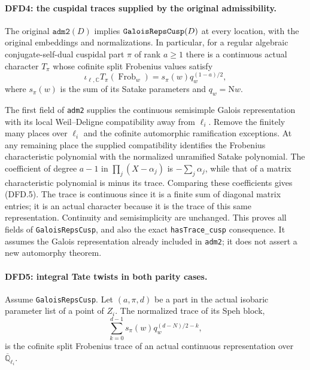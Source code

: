 \documentclass[11pt,a4paper]{article}
\numberwithin{equation}{section}
\theoremstyle{remark}\newtheorem{remark}[theorem]{Remark}
\begin{document}
\paragraph{DFD4: the cuspidal traces supplied by the original admissibility.}
\label{claim:DFD4}
The original $\texttt{adm2}(D)$ implies
$\texttt{Galois\allowbreak Reps\allowbreak Cusp}(D)$ at every location, with the
original embeddings and normalizations. In particular, for a
regular algebraic conjugate-self-dual cuspidal part $\pi$ of
rank $a\ge1$ there is a continuous actual character $T_\pi$
whose cofinite split Frobenius values satisfy
\[
 \iota_{\ell,\mathbb C}T_\pi(\operatorname{Frob}_w)
       =s_\pi(w)q_w^{(1-a)/2},                            \tag{DFD.5}
\]
where $s_\pi(w)$ is the sum of its Satake parameters and
$q_w=\mathrm Nw$.

The first field of \texttt{adm2} supplies the continuous
semisimple Galois representation with its local
Weil--Deligne compatibility away from $\ell_i$. Remove the
finitely many places over $\ell_i$ and the cofinite automorphic
ramification exceptions. At any remaining place the supplied
compatibility identifies the Frobenius characteristic
polynomial with the normalized unramified Satake polynomial.
The coefficient of degree $a-1$ in
$\prod_j(X-\alpha_j)$ is $-\sum_j\alpha_j$, while that of a
matrix characteristic polynomial is minus its trace. Comparing
these coefficients gives (DFD.5). The trace is continuous since
it is a finite sum of diagonal matrix entries; it is an actual
character because it is the trace of this same representation.
Continuity and semisimplicity are unchanged. This proves all
fields of \texttt{Galois\allowbreak Reps\allowbreak Cusp}, and also the exact
\texttt{has\allowbreak Trace\_\allowbreak cusp} consequence. It assumes the Galois
representation already included in \texttt{adm2}; it does not
assert a new automorphy theorem.

\paragraph{DFD5: integral Tate twists in both parity cases.}
\label{claim:DFD5}
Assume \texttt{Galois\allowbreak Reps\allowbreak Cusp}. Let $(a,\pi,d)$ be a part in
the actual isobaric parameter list of a point of $Z_i$. The
normalized trace of its Speh block,
\[
       \sum_{k=0}^{d-1}s_\pi(w)q_w^{(d-N)/2-k},           \tag{DFD.6}
\]
is the cofinite split Frobenius trace of an actual continuous
representation over $\overline{\mathbb Q}_{\ell_i}$.
\end{document}
